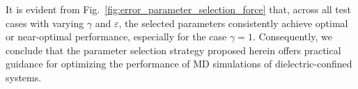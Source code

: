 It is evident from Fig.~\ref{fig:error_parameter_selection_force} that, across all test cases with varying $\gamma$ and $\varepsilon$, the selected parameters consistently achieve optimal or near-optimal performance, especially for the case $\gamma = 1$. 
Consequently, we conclude that the parameter selection strategy proposed herein offers practical guidance for optimizing the performance of MD simulations of dielectric-confined systems.